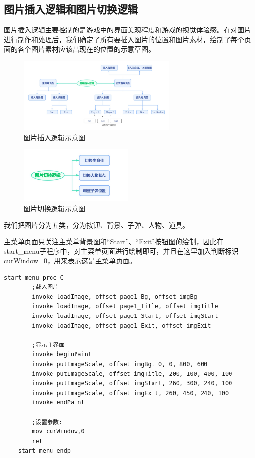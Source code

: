 \subsection{图片插入逻辑和图片切换逻辑}
图片插入逻辑主要控制的是游戏中的界面美观程度和游戏的视觉体验感。在对图片进行制作和处理后，我们确定了所有要插入图片的位置和图片素材，绘制了每个页面的各个图片素材应该出现在的位置的示意草图。
\begin{figure}[htbp]
    \vspace{13pt} %
    \centering
    \includegraphics[width=0.7\textwidth]{images/3-3.jpg}
    \caption{图片插入逻辑示意图}%
\end{figure}
\begin{figure}[htbp]
    \vspace{13pt} %
    \centering
    \includegraphics[width=0.5\textwidth]{images/3-4.jpg}
    \caption{图片切换逻辑示意图}%
\end{figure}
\par
我们把图片分为五类，分为按钮、背景、子弹、人物、道具。
\par
主菜单页面只关注主菜单背景图和“Start”、“Exit”按钮图的绘制，因此在start\_menu子程序中，对主菜单页面进行绘制即可，并且在这里加入判断标识curWindow=0，用来表示这是主菜单页面。
\begin{lstlisting}[language={[x86masm]Assembler}]
    start_menu proc C
        ;载入图片
        invoke loadImage, offset page1_Bg, offset imgBg
        invoke loadImage, offset page1_Title, offset imgTitle
        invoke loadImage, offset page1_Start, offset imgStart
        invoke loadImage, offset page1_Exit, offset imgExit	

        ;显示主界面
        invoke beginPaint
        invoke putImageScale, offset imgBg, 0, 0, 800, 600
        invoke putImageScale, offset imgTitle, 200, 100, 400, 100
        invoke putImageScale, offset imgStart, 260, 300, 240, 100
        invoke putImageScale, offset imgExit, 260, 450, 240, 100
        invoke endPaint

        ;设置参数:
        mov curWindow,0
        ret 
    start_menu endp
\end{lstlisting}
